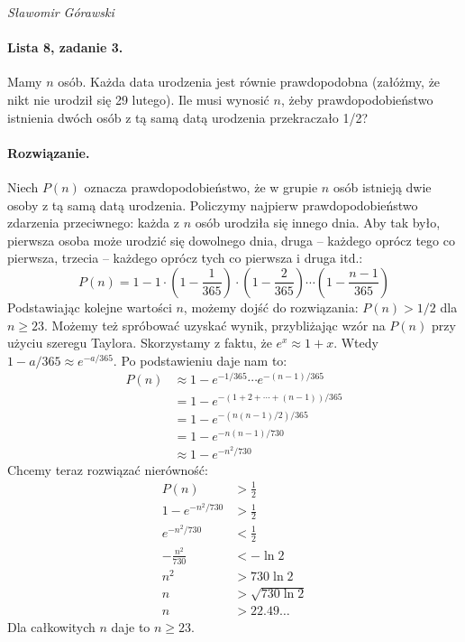 \documentclass{article}
\begin{document}
\begin{flushright}
\textit{Sławomir Górawski}
\end{flushright}

\paragraph{Lista 8, zadanie 3.}
Mamy $n$ osób. Każda data urodzenia jest równie prawdopodobna
(załóżmy, że nikt nie urodził się 29 lutego).
Ile musi wynosić $n$,
żeby prawdopodobieństwo istnienia dwóch osób z tą samą datą urodzenia
przekraczało 1/2?

\paragraph{Rozwiązanie.}
Niech $P(n)$ oznacza prawdopodobieństwo,
że w grupie $n$ osób istnieją dwie osoby z tą samą datą urodzenia.
Policzymy najpierw prawdopodobieństwo zdarzenia przeciwnego:
każda z $n$ osób urodziła się innego dnia.
Aby tak było, pierwsza osoba może urodzić się dowolnego dnia,
druga -- każdego oprócz tego co pierwsza,
trzecia -- każdego oprócz tych co pierwsza i druga itd.:
\[
    P(n) = 1 - 1 \cdot
        \left( 1 - \frac{1}{365} \right) \cdot
        \left( 1 - \frac{2}{365} \right)
        \cdots
        \left( 1 - \frac{n - 1}{365} \right)
\]
Podstawiając kolejne wartości $n$,
możemy dojść do rozwiązania: $P(n) > 1/2$ dla $n \ge 23$.
Możemy też spróbować uzyskać wynik,
przybliżając wzór na $P(n)$ przy użyciu szeregu Taylora.
Skorzystamy z faktu, że $e^x \approx 1 + x$.
Wtedy $1 - a/365 \approx e^{-a/365}$.
Po podstawieniu daje nam to:
\begin{align*}
    P(n) &\approx 1 - e^{-1/365} \cdots e^{-(n - 1)/365} \\
        &= 1 - e^{-(1 + 2 + \cdots + (n - 1))/365} \\
        &= 1 - e^{-(n(n - 1)/2)/365} \\
        &= 1 - e^{-n(n - 1)/730} \\
        &\approx 1 - e^{-n^2/730}
\end{align*}
Chcemy teraz rozwiązać nierówność:
\begin{align*}
    P(n) &> \frac{1}{2} \\
    1 - e^{-n^2/730} &> \frac{1}{2} \\
    e^{-n^2/730} &< \frac{1}{2} \\
    -\frac{n^2}{730} &< -\ln 2 \\
    n^2 &> 730 \ln 2 \\
    n &> \sqrt{730 \ln 2} \\
    n &> 22.49\dots
\end{align*}
Dla całkowitych $n$ daje to $n \ge 23$.
\end{document}
